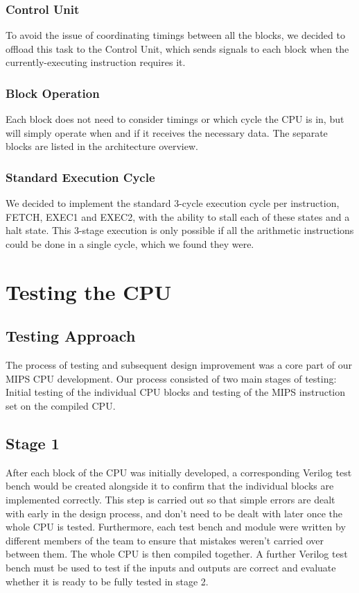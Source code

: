 \documentclass{article}
\begin{document}
\subsubsection{Control Unit}
To avoid the issue of coordinating timings between all the blocks, we decided to offload this task to the Control Unit, which sends signals to each block when the currently-executing instruction requires it. 
\subsubsection{Block Operation}
Each block does not need to consider timings or which cycle the CPU is in, but will simply operate when and if it receives the necessary data. The separate blocks are listed in the architecture overview. 
\subsubsection{Standard Execution Cycle}
We decided to implement the standard 3-cycle execution cycle per instruction, FETCH, EXEC1 and EXEC2, with the ability to stall each of these states and a halt state. This 3-stage execution is only possible if all the arithmetic instructions could be done in a single cycle, which we found they were.

\section{Testing the CPU}

\subsection{Testing Approach}

The process of testing and subsequent design improvement was a core part of our MIPS CPU development. Our process consisted of two main stages of testing: Initial testing of the individual CPU blocks and testing of the MIPS instruction set on the compiled CPU. 

\subsection{Stage 1}

After each block of the CPU was initially developed, a corresponding Verilog test bench would be created alongside it to confirm that the individual blocks are implemented correctly. This step is carried out so that simple errors are dealt with early in the design process, and don’t need to be dealt with later once the whole CPU is tested. Furthermore, each test bench and module were written by different members of the team to ensure that mistakes weren’t carried over between them. The whole CPU is then compiled together. A further Verilog test bench must be used to test if the inputs and outputs are correct and evaluate whether it is ready to be fully tested in stage 2.
\end{document}
